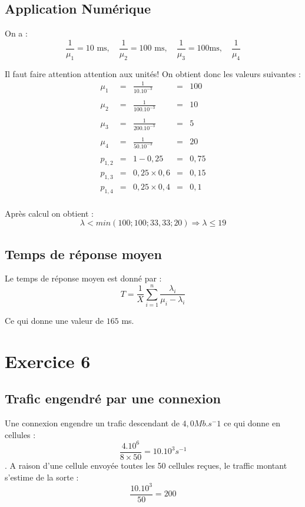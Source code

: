 \documentclass[a4paper, 11pt, fleqn]{article}
\newcommand{\inve}[1]{\frac{1}{#1}}
\begin{document}
\subsection{Application Numérique}

On a : $$
\inve{\mu_1} = 10 \mbox{ ms}, \quad \inve{\mu_2} = 100 \mbox{ ms}, \quad \inve{\mu_3} = 100 \mbox{
ms}, \quad \inve{\mu_4} $$

Il faut faire attention attention aux unités! On obtient donc les valeurs suivantes : $$
\begin{array}{rcccl}
	\mu_1 & = & \displaystyle \inve{10. 10^{-3}} & = & 100 \\~\\
	\mu_2 & = & \displaystyle \inve{100. 10^{-3}} & = & 10 \\~\\
	\mu_3 & = & \displaystyle \inve{200. 10^{-3}} & = & 5 \\~\\
	\mu_4 & = & \displaystyle \inve{50. 10^{-3}} & = & 20 \\~\\
	p_{1,2} & = & 1 - 0,25 & = & 0,75 \\
	p_{1,3} & = & 0,25 \times 0,6 & = & 0,15 \\
	p_{1,4} & = & 0,25 \times 0,4 & = & 0,1 \\
\end{array} $$

Après calcul on obtient : $$
\lambda < min (100; 100; 33,33; 20) \Longrightarrow \lambda \leq 19 $$

\subsection{Temps de réponse moyen}

Le temps de réponse moyen est donné par : $$
T = \inve{X} \sum_{i=1}^{n} \frac{\lambda_i}{\mu_i - \lambda_i} $$

Ce qui donne une valeur de $165$ ms.

\section{Exercice 6}

\subsection{Trafic engendré par une connexion}

Une connexion engendre un trafic descendant de $4,0 Mb.s^-1$ ce qui donne en cellules : $$
\frac{4.10^6}{8 \times 50} = 10. 10^3 s^{-1} $$. A raison d'une cellule envoyée toutes les 50
cellules reçues, le traffic montant s'estime de la sorte : $$
\frac{10.10^3}{50} = 200 $$
\end{document}
